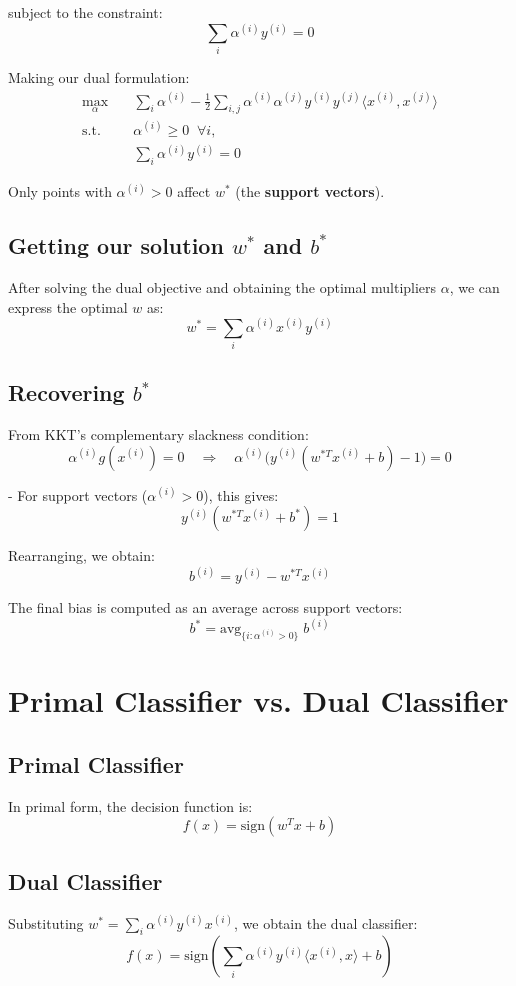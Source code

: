 \documentclass[11pt]{article}
\begin{document}
subject to the constraint:
\[
\sum_i \alpha^{(i)} y^{(i)} = 0
\]

Making our dual formulation:
\[
\begin{aligned}
\max_{\alpha} \quad & 
\sum_i \alpha^{(i)} 
- \tfrac{1}{2} \sum_{i,j} \alpha^{(i)} \alpha^{(j)} y^{(i)} y^{(j)} \langle x^{(i)}, x^{(j)} \rangle \\
\text{s.t.} \quad & \alpha^{(i)} \geq 0 \;\; \forall i, \\
& \sum_i \alpha^{(i)} y^{(i)} = 0
\end{aligned}
\]


Only points with $\alpha^{(i)} > 0$ affect $w^*$ (the \textbf{support vectors}).


\subsection*{Getting our solution $w^*$ and $b^*$}

After solving the dual objective and obtaining the optimal multipliers $\alpha$, we can express the optimal $w$ as:
\[
w^* = \sum_i \alpha^{(i)} x^{(i)} y^{(i)}
\]

\subsection*{Recovering $b^*$}
From KKT’s complementary slackness condition:
\[
\alpha^{(i)} g(x^{(i)}) = 0
\quad \Rightarrow \quad
\alpha^{(i)} \Big( y^{(i)} (w^{*T} x^{(i)} + b) - 1 \Big) = 0
\]

- For support vectors ($\alpha^{(i)} > 0$), this gives:
\[
y^{(i)} (w^{*T} x^{(i)} + b^*) = 1
\]

Rearranging, we obtain:
\[
b^{(i)} = y^{(i)} - w^{*T} x^{(i)}
\]

The final bias is computed as an average across support vectors:
\[
b^* = \text{avg}_{\{i : \alpha^{(i)} > 0\}} \; b^{(i)}
\]

\section*{Primal Classifier vs. Dual Classifier}

\subsection*{Primal Classifier}
In primal form, the decision function is:
\[
f(x) = \text{sign}(w^T x + b)
\]

\subsection*{Dual Classifier}
Substituting $w^* = \sum_i \alpha^{(i)} y^{(i)} x^{(i)}$, we obtain the dual classifier:
\[
f(x) = \text{sign}\!\left( \sum_i \alpha^{(i)} y^{(i)} \langle x^{(i)}, x \rangle + b \right)
\]
\end{document}
